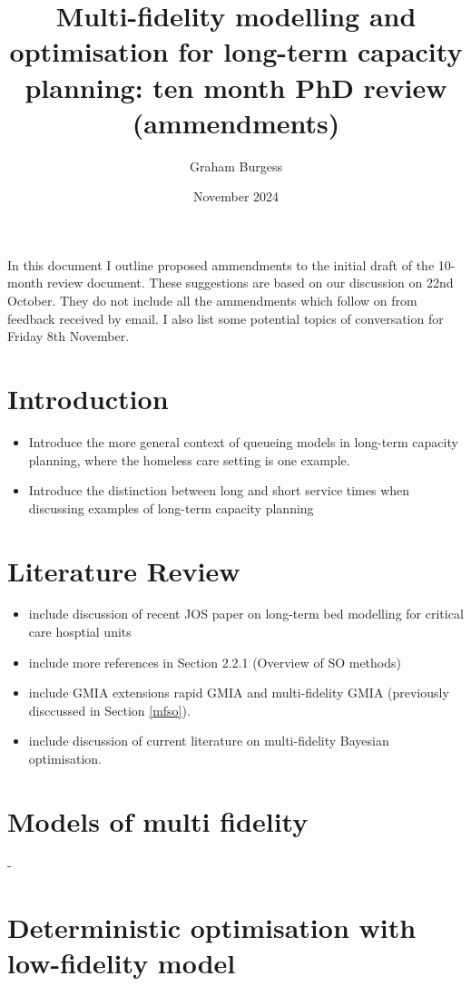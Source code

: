 \documentclass[12pt,a4paper]{article}
\title{Multi-fidelity modelling and optimisation for long-term capacity planning: ten month PhD review (ammendments)}
\author{Graham Burgess}
\date{November 2024}
\begin{document}
%
\maketitle
%

In this document I outline proposed ammendments to the initial draft of the 10-month review document. These suggestions are based on our discussion on 22nd October. They do not include all the ammendments which follow on from feedback received by email. I also list some potential topics of conversation for Friday 8th November.

\section{Introduction}
%
\begin{itemize}[noitemsep]
\item Introduce the more general context of queueing models in long-term capacity planning, where the homeless care setting is one example. 
\item Introduce the distinction between long and short service times when discussing examples of long-term capacity planning
\end{itemize}
%
\section{Literature Review} \label{lit-rev}
%
\begin{itemize}[noitemsep]
\item include discussion of recent JOS paper on long-term bed modelling for critical care hosptial units
\item include more references in Section 2.2.1 (Overview of SO methods)
\item include GMIA extensions rapid GMIA and multi-fidelity GMIA (previously disccussed in Section \ref{mfso}). 
\item include discussion of current literature on multi-fidelity Bayesian optimisation.
\end{itemize}
%
\section{Models of multi fidelity} \label{models}

- 

\section{Deterministic optimisation with low-fidelity model} \label{do}
\end{document}

